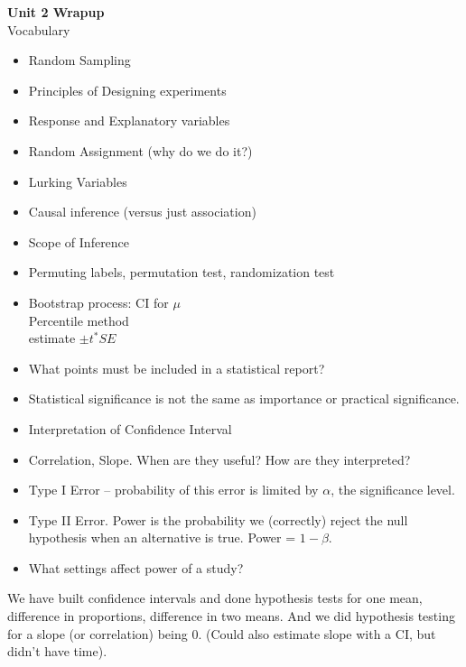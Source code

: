 \def\theTopic{Unit 2 Wrapup }
\def\dayNum{20 }

\begin{center}
\vspace*{-.2in}
{\bf {\large Unit 2 Wrapup}}\\
Vocabulary
\end{center}
\vspace{-.1in}
\begin{itemize}
  \item  Random Sampling
  \item Principles of Designing experiments
  \item  Response and Explanatory variables
  \item  Random Assignment (why do we do it?)
  \item  Lurking Variables
  \item  Causal inference (versus just association)
  \item  Scope of Inference
  \item  Permuting labels, permutation test, randomization test
  \item  Bootstrap process: CI for $\mu$\\
         Percentile method\\
         estimate $\pm t^* SE$
  \item  What points must be included in a statistical report?
  \item  Statistical significance is not the same as importance or practical
    significance.
  \item Interpretation of Confidence Interval
  \item Correlation, Slope. When are they useful? How are they interpreted?
  \item  Type I Error  – probability of this error is limited by
    $\alpha$, the significance level.
  \item  Type II Error.   Power is the probability we (correctly)
    reject the null hypothesis when an alternative is true. Power =  $1-\beta$.
  \item  What settings affect power of a study?
  \end{itemize}
  
  We have built confidence intervals and done hypothesis tests for one
  mean, difference in proportions, difference in two means. And we did
  hypothesis testing for a slope (or correlation) being 0. (Could also
  estimate slope with a CI, but didn't have time).

